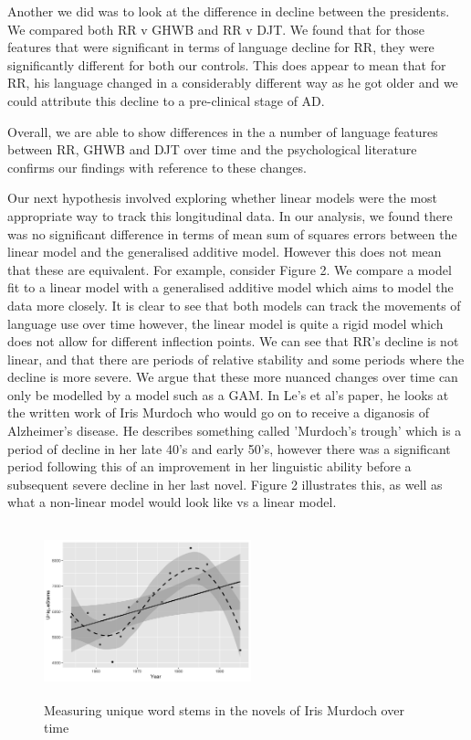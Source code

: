 \documentclass[12pt]{article}
\begin{document}
\par 
Another we did was to look at the difference in decline between the presidents. We compared both RR v GHWB and RR v DJT. We found that for those features that were significant in terms of language decline for RR, they were significantly different for both our controls. This does appear to mean that for RR, his language changed in a considerably different way as he got older and we could attribute this decline to a pre-clinical stage of AD.
\par
Overall, we are able to show differences in the a number of language features between RR, GHWB and DJT over time and the psychological literature confirms our findings with reference to these changes.
\par
Our next hypothesis involved exploring whether linear models were the most appropriate way to track this longitudinal data. In our analysis, we found there was no significant difference in terms of mean sum of squares errors between the linear model and the generalised additive model. However this does not mean that these are equivalent. For example, consider Figure 2. We compare a model fit to a linear model with a generalised additive model which aims to model the data more closely. It is clear to see that both models can track the movements of language use over time however, the linear model is quite a rigid model which does not allow for different inflection points. We can see that RR's decline is not linear, and that there are periods of relative stability and some periods where the decline is more severe. We argue that these more nuanced changes over time can only be modelled by a model such as a GAM. In Le's et al's paper, he looks at the written work of Iris Murdoch who would go on to receive a diganosis of Alzheimer's disease. He describes something called 'Murdoch's trough' which is a period of decline in her late 40's and early 50's, however there was a significant period following this of an improvement in her linguistic ability before a subsequent severe decline in her last novel. Figure 2 illustrates this, as well as what a non-linear model would look like vs a linear model.
\begin{figure}[H]
	\centering
	\includegraphics[width=6cm, height=5cm]{plots/IMStems.png}
	\caption{Measuring unique word stems in the novels of Iris Murdoch over time}
\end{figure}
\end{document}
